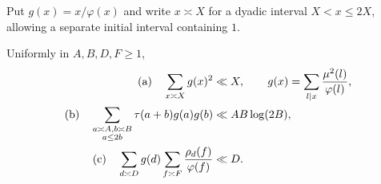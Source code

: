 Put $g(x)=x/\varphi(x)$ and write $x\asymp X$ for a dyadic interval
$X<x\le2X$, allowing a separate initial interval containing $1$.
\begin{lemma}\label{L:8.3}
Uniformly in $A,B,D,F\ge1$,
\begin{align}
 \textup{(a)}\quad\sum_{x\asymp X}g(x)^2&\ll X,\qquad
             g(x)=\sum_{l\mid x}\frac{\mu^2(l)}{\varphi(l)},\label{A:eq:gmean}\\
 \textup{(b)}\quad\sum_{\substack{a\asymp A,b\asymp B\\a\le2b}}
          \tau(a+b)g(a)g(b)&\ll AB\log(2B),\label{A:eq:abmass}\\
 \textup{(c)}\quad\sum_{d\asymp D}g(d)\sum_{f\asymp F}\frac{\rho_d(f)}{\varphi(f)}&\ll D.
                                                        \label{A:eq:rootmass}
\end{align}
\end{lemma}
